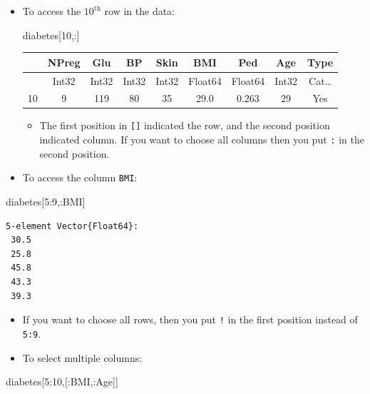 \documentclass[
  letterpaper,
]{book}
\newenvironment{Shaded}{\begin{snugshade}}{\end{snugshade}}
\newcommand{\FloatTok}[1]{\textcolor[rgb]{0.68,0.00,0.00}{#1}}
\newcommand{\NormalTok}[1]{\textcolor[rgb]{0.00,0.23,0.31}{#1}}
\newcommand{\OperatorTok}[1]{\textcolor[rgb]{0.37,0.37,0.37}{#1}}
\providecommand{\tightlist}{%
  \setlength{\itemsep}{0pt}\setlength{\parskip}{0pt}}\usepackage{longtable,booktabs,array}
\begin{document}
\begin{itemize}
\item
  To access the \(10^\text{th}\) row in the data:

\begin{Shaded}
\begin{Highlighting}[]
\NormalTok{diabetes[}\FloatTok{10}\NormalTok{,}\OperatorTok{:}\NormalTok{]}
\end{Highlighting}
\end{Shaded}

  \hypertarget{tenth_row}{}
  \begin{tabular}{r|cccccccc}
    & NPreg & Glu & BP & Skin & BMI & Ped & Age & Type\\
    \hline
    & Int32 & Int32 & Int32 & Int32 & Float64 & Float64 & Int32 & Cat…\\
    \hline
    10 & 9 & 119 & 80 & 35 & 29.0 & 0.263 & 29 & Yes \\
  \end{tabular}

  \begin{itemize}
  \tightlist
  \item
    The first position in \texttt{{[}{]}} indicated the row, and the
    second position indicated column. If you want to choose all columns
    then you put \texttt{:} in the second position.
  \end{itemize}
\item
  To access the column \texttt{BMI}:
\end{itemize}

\begin{Shaded}
\begin{Highlighting}[]
\NormalTok{diabetes[}\FloatTok{5}\OperatorTok{:}\FloatTok{9}\NormalTok{,}\OperatorTok{:}\NormalTok{BMI]}
\end{Highlighting}
\end{Shaded}

\begin{verbatim}
5-element Vector{Float64}:
 30.5
 25.8
 45.8
 43.3
 39.3
\end{verbatim}

\begin{itemize}
\item
  If you want to choose all rows, then you put \texttt{!} in the first
  position instead of \texttt{5:9}.
\item
  To select multiple columns:
\end{itemize}

\begin{Shaded}
\begin{Highlighting}[]
\NormalTok{diabetes[}\FloatTok{5}\OperatorTok{:}\FloatTok{10}\NormalTok{,[}\OperatorTok{:}\NormalTok{BMI,}\OperatorTok{:}\NormalTok{Age]]}
\end{Highlighting}
\end{Shaded}
\end{document}
